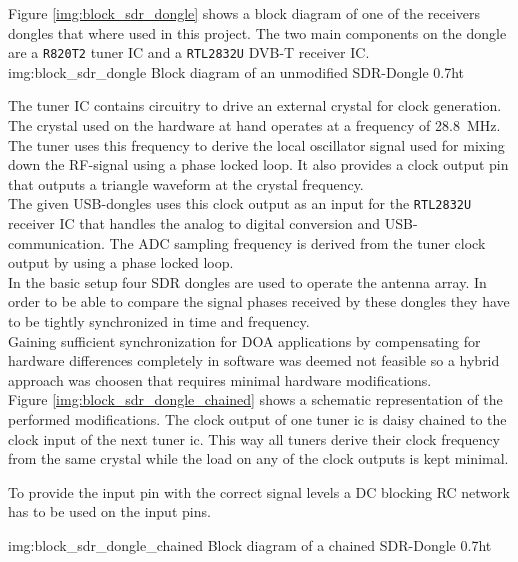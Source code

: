 Figure \ref{img:block_sdr_dongle} shows a block
diagram of one of the receivers dongles that where used
in this project.
The two main components on the dongle are a \texttt{R820T2} tuner IC
and a \texttt{RTL2832U} DVB-T receiver IC. \\

             {img:block_sdr_dongle}
             {Block diagram of an unmodified SDR-Dongle}
             {0.7}{ht}

The tuner IC contains circuitry to drive an
external crystal for clock generation.
The crystal used on the hardware at hand
operates at a frequency of \SI{28.8}{\mega\hertz}.
The tuner uses this frequency to derive the
local oscillator signal used for mixing down
the RF-signal using a phase locked loop.
It also provides a clock output pin that
outputs a triangle waveform at the crystal
frequency. \\

The given USB-dongles uses this clock output
as an input for the \texttt{RTL2832U}
receiver IC that handles the analog to digital
conversion and USB-communication.
The ADC sampling frequency is derived from
the tuner clock output by using a phase locked loop. \\

In the basic setup four SDR dongles are used
to operate the antenna array.
In order to be able to compare the signal phases
received by these dongles they have to be tightly
synchronized in time and frequency. \\

Gaining sufficient synchronization for DOA applications
by compensating for hardware differences completely
in software was deemed not feasible so a hybrid
approach was choosen that requires minimal hardware
modifications. \\


Figure \ref{img:block_sdr_dongle_chained} shows
a schematic representation of the performed modifications.
The clock output of one tuner ic is daisy chained to
the clock input of the next tuner ic.
This way all tuners derive their clock frequency
from the same crystal while the load on any of
the clock outputs is kept minimal.

To provide the input pin with the correct signal
levels a DC blocking RC network has to be used
on the input pins.

             {img:block_sdr_dongle_chained}
             {Block diagram of a chained SDR-Dongle}
             {0.7}{ht}

